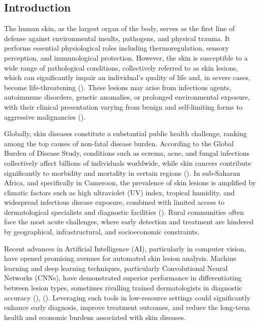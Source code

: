 \documentclass[
  12pt,
  oneside]{article}
\begin{document}
\subsection{Introduction}\label{introduction-1}

The human skin, as the largest organ of the body, serves as the first
line of defense against environmental insults, pathogens, and physical
trauma. It performs essential physiological roles including
thermoregulation, sensory perception, and immunological protection.
However, the skin is susceptible to a wide range of pathological
conditions, collectively referred to as skin lesions, which can
significantly impair an individual's quality of life and, in severe
cases, become life-threatening (). These lesions may arise from infectious agents, autoimmune
disorders, genetic anomalies, or prolonged environmental exposure, with
their clinical presentation varying from benign and self-limiting forms
to aggressive malignancies ().

Globally, skin diseases constitute a substantial public health
challenge, ranking among the top causes of non-fatal disease burden.
According to the Global Burden of Disease Study, conditions such as
eczema, acne, and fungal infections collectively affect billions of
individuals worldwide, while skin cancers contribute significantly to
morbidity and mortality in certain regions
(). In sub-Saharan
Africa, and specifically in Cameroon, the prevalence of skin lesions is
amplified by climatic factors such as high ultraviolet (UV) index,
tropical humidity, and widespread infectious disease exposure, combined
with limited access to dermatological specialists and diagnostic
facilities (). Rural
communities often face the most acute challenges, where early detection
and treatment are hindered by geographical, infrastructural, and
socioeconomic constraints.

Recent advances in Artificial Intelligence (AI), particularly in
computer vision, have opened promising avenues for automated skin lesion
analysis. Machine learning and deep learning techniques, particularly
Convolutional Neural Networks (CNNs), have demonstrated superior
performance in differentiating between lesion types, sometimes rivalling
trained dermatologists in diagnostic accuracy
(),
(). Leveraging such
tools in low-resource settings could significantly enhance early
diagnosis, improve treatment outcomes, and reduce the long-term health
and economic burdens associated with skin diseases.
\end{document}
